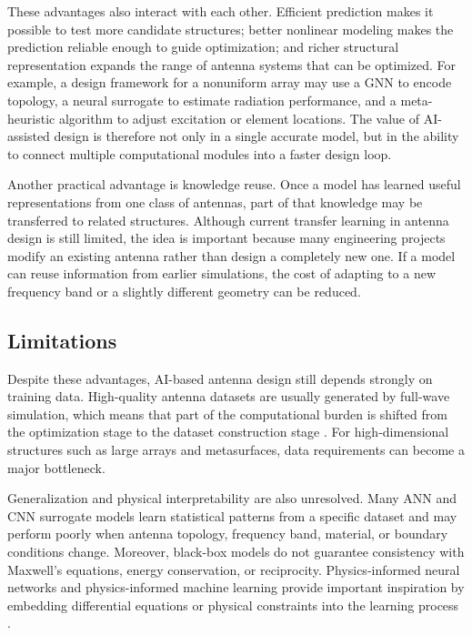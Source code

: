 \documentclass{article}
\begin{document}
These advantages also interact with each other. Efficient prediction makes it possible to test more candidate structures; better nonlinear modeling makes the prediction reliable enough to guide optimization; and richer structural representation expands the range of antenna systems that can be optimized. For example, a design framework for a nonuniform array may use a GNN to encode topology, a neural surrogate to estimate radiation performance, and a meta-heuristic algorithm to adjust excitation or element locations. The value of AI-assisted design is therefore not only in a single accurate model, but in the ability to connect multiple computational modules into a faster design loop.

Another practical advantage is knowledge reuse. Once a model has learned useful representations from one class of antennas, part of that knowledge may be transferred to related structures. Although current transfer learning in antenna design is still limited, the idea is important because many engineering projects modify an existing antenna rather than design a completely new one. If a model can reuse information from earlier simulations, the cost of adapting to a new frequency band or a slightly different geometry can be reduced.

\subsection{Limitations}

Despite these advantages, AI-based antenna design still depends strongly on training data. High-quality antenna datasets are usually generated by full-wave simulation, which means that part of the computational burden is shifted from the optimization stage to the dataset construction stage \cite{sarker2023review,belen2023transmitarray}. For high-dimensional structures such as large arrays and metasurfaces, data requirements can become a major bottleneck.

Generalization and physical interpretability are also unresolved. Many ANN and CNN surrogate models learn statistical patterns from a specific dataset and may perform poorly when antenna topology, frequency band, material, or boundary conditions change. Moreover, black-box models do not guarantee consistency with Maxwell's equations, energy conservation, or reciprocity. Physics-informed neural networks and physics-informed machine learning provide important inspiration by embedding differential equations or physical constraints into the learning process \cite{raissi2019pinn,karniadakis2021piml}.
\end{document}
